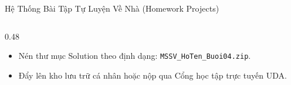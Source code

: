 \documentclass[aspectratio=169, 10pt]{beamer}
\begin{document}
\begin{frame}{Hệ Thống Bài Tập Tự Luyện Về Nhà (Homework Projects)}
\begin{columns}[T]
\begin{column}{0.48\textwidth}
      \begin{tcolorbox}[colback=UniNavy!5,colframe=UniNavy,title=\textbf{Quy cách nộp bài},fonttitle=\small\bfseries]
        \begin{itemize}\small
          \item Nén thư mục Solution theo định dạng: \texttt{MSSV\_HoTen\_Buoi04.zip}.
          \item Đẩy lên kho lưu trữ cá nhân hoặc nộp qua Cổng học tập trực tuyến UDA.
        \end{itemize}
      \end{tcolorbox}
    \end{column}
  \end{columns}
\end{frame}

\end{document}
